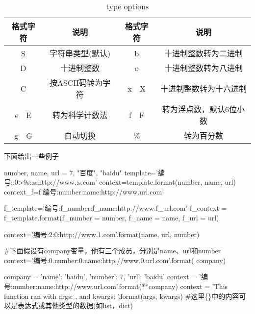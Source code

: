       \begin{table}[htb]
        \centering
        \caption{type options}
        \label{tab:type options}
        \begin{tabular}{cccc}
          \toprule[1.5pt]
          格式字符 & 说明 & 格式字符 & 说明 \\
          \midrule
          S & 字符串类型(默认) & b & 十进制整数转为二进制 \\
          D & 十进制整数 & o & 十进制整数转为八进制 \\
          C & 按ASCII码转为字符 & x~~X & 十进制整数转为十六进制 \\
          e~~E & 转为科学计数法 & f~~F & 转为浮点数，默认6位小数 \\
          g~~G & 自动切换 & \% & 转为百分数 \\
          \bottomrule[1.5pt]
        \end{tabular}
      \end{table}

      下面给出一些例子
      \begin{codeblock}[language=python, caption={examples of format string}]
        number, name, url = 7, "百度", "baidu"
        template='编号:{:0>9s}:{:s}:http://www.{:s}.com'
        context=template.format(number, name, url)
        context_f=f'编号:{number}:{name}:http://www.{url}.com'

        f_template='编号:{f_number}:{f_name}:http://www.{f_url}.com'
        f_context = f_template.format(f_number = number, f_name = name, f_url = url)

        context='编号:{2}:{0}:http://www.{1}.com'.format(name, url, number)

        #下面假设有company变量，他有三个成员，分别是name、url和number
        context='编号:{0.number}:{0.name}:http://www.{0.url}.com'.format(
            company)
      
        company = {'name': 'baidu', 'number': 7, 'url': 'baidu'}
        context = '编号:{number}:{name}:http://www.{url}.com'.format(**company)
        context = 'This function ran with args: {}, and kwargs: {}'.format(args, kwargs)
        #这里\{\}中的内容可以是表达式或其他类型的数据(如list，dict)
      \end{codeblock}

